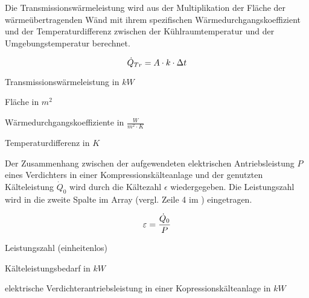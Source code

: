 Die Transmissionswärmeleistung wird aus der Multiplikation der Fläche
der wärmeübertragenden Wänd mit ihrem spezifischen Wärmedurchgangskoeffizient
und der Temperaturdifferenz zwischen der Kühlraumtemperatur und der
Umgebungstemperatur berechnet.

\begin{equation}
	\ptrans = A \cdot k \cdot \Delta t
	\label{ptrans}
\end{equation}

\begin{description}[\dth]

	\item[$\ptrans$] Transmissionswärmeleistung in $kW$
	\item[$A$] Fläche in $m^2$
	\item[$k$] Wärmedurchgangskoeffiziente in $\frac{W}{m^2 \cdot K}$
	\item[$\Delta\: t$] Temperaturdifferenz in $K$

\end{description}
\vspace{0.5cm}



Der Zusammenhang zwischen der aufgewendeten elektrischen Antriebsleistung $P$
eines Verdichters in einer Kompressionskälteanlage und der genutzten
Kälteleistung ${\dot{Q}}_0$ wird durch die Kältezahl $\epsilon$ wiedergegeben.
Die Leistungszahl wird in die zweite Spalte im Array (vergl. Zeile 4 im
) eingetragen.

\begin{equation}
	\epsilon = \frac{\pkalt}{P}
\label{epsilon}
\end{equation}

\begin{description}[\dth]

	\item[$\epsilon$] Leistungszahl (einheitenlos)
	\item[$\pkalt$] Kälteleistungsbedarf in $kW$
	\item[$P$] elektrische Verdichterantriebsleistung in einer
		Kopressionskälteanlage in $kW$

\end{description}
\vspace{0.5cm}

